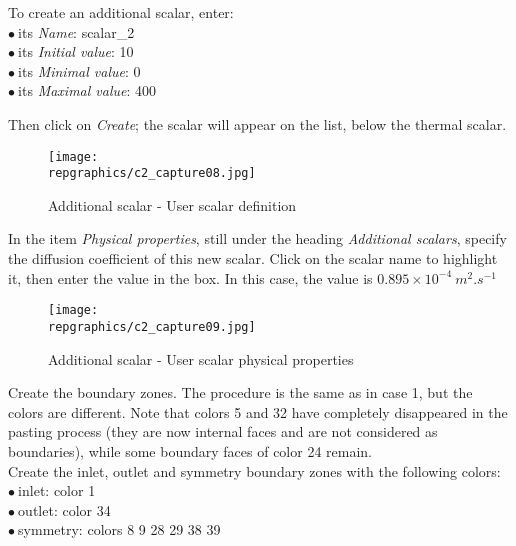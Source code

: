 To create an additional scalar, enter:\\
\hspace*{1cm}$\bullet\ $its {\itshape Name}: scalar\_2\\
\hspace*{1cm}$\bullet\ $its {\itshape Initial value}: 10\\
\hspace*{1cm}$\bullet\ $its {\itshape Minimal value}: 0\\
\hspace*{1cm}$\bullet\ $its {\itshape Maximal value}: 400

Then click on {\itshape Create}; the scalar will appear on the list,
below the thermal scalar.

\begin{figure}[h!]
\begin{center}
\texttt{[image: \\repgraphics/c2\_capture08.jpg]} 
\caption{Additional scalar - User scalar definition}
\label{fig8_e2}
\end{center}
\end{figure}


\newpage
In the item {\itshape Physical properties}, still under the heading
{\itshape Additional scalars}, specify the diffusion coefficient of this new
scalar. Click on the scalar name to highlight it, then enter the value in the
box. In this case, the value is
$0.895\times 10^{-4}\ m^{2}.s^{-1}$  

\begin{figure}[h!]
\begin{center}
\texttt{[image: \\repgraphics/c2\_capture09.jpg]} 
\caption{Additional scalar - User scalar physical properties}
\label{fig9_e2}
\end{center}
\end{figure}


\newpage
Create the boundary zones. The procedure is the same as in case 1, but the
colors are different. Note that colors 5 and 32 have completely disappeared in
the pasting process (they are now internal faces and are not considered as
boundaries), while some boundary faces of color 24 remain.\\
Create the inlet, outlet
and symmetry boundary zones with the following colors:\\
\hspace*{1cm}$\bullet\ $inlet: color 1\\
\hspace*{1cm}$\bullet\ $outlet: color 34\\
\hspace*{1cm}$\bullet\ $symmetry: colors 8 9 28 29 38 39\\

